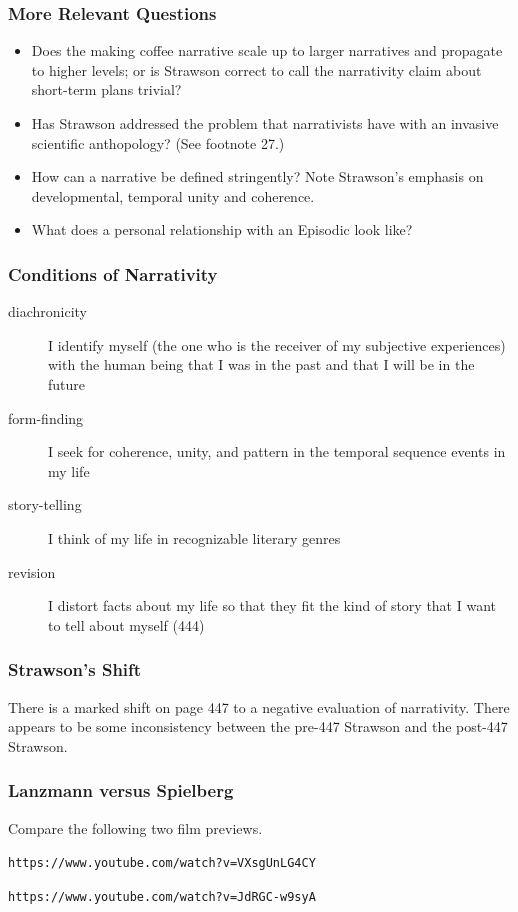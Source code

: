 \documentclass[xcolor=dvipsnames]{beamer}
\begin{document}
\begin{frame}
  \frametitle{More Relevant Questions}
  \begin{itemize}
  \item Does the making coffee narrative scale up to larger narratives
    and propagate to higher levels; or is Strawson correct to call the
    narrativity claim about short-term plans trivial?
  \item Has Strawson addressed the problem that narrativists have with
    an invasive scientific anthopology? (See footnote 27.)
  \item How can a narrative be defined stringently? Note Strawson's
    emphasis on developmental, temporal unity and coherence.
  \item What does a personal relationship with an Episodic look like?
  \end{itemize}
\end{frame}

\begin{frame}
  \frametitle{Conditions of Narrativity}
  \begin{description}
  \item[diachronicity] I identify myself (the one who is the receiver
    of my subjective experiences) with the human being that I was in
    the past and that I will be in the future
  \item[form-finding] I seek for coherence, unity, and pattern in the
    temporal sequence events in my life
  \item[story-telling] I think of my life in recognizable literary
    genres
  \item[revision] I distort facts about my life so that they fit the
    kind of story that I want to tell about myself (444)
  \end{description}
\end{frame}

\begin{frame}
  \frametitle{Strawson's Shift}
  There is a marked shift on page 447 to a negative evaluation of
  narrativity. There appears to be some inconsistency between the
  pre-447 Strawson and the post-447 Strawson.
\end{frame}

\begin{frame}
  \frametitle{Lanzmann versus Spielberg}
  Compare the following two film previews.
  \begin{alltt}
    https://www.youtube.com/watch?v=VXsgUnLG4CY
  \end{alltt}
  \begin{alltt}
    https://www.youtube.com/watch?v=JdRGC-w9syA
  \end{alltt}
\end{frame}
\end{document}
